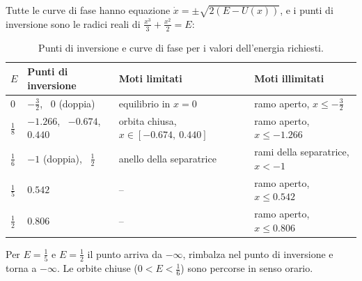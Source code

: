 \documentclass[11pt, a4paper, openright]{book}
\theoremstyle{plain}
\theoremstyle{definition}
\theoremstyle{remark}
\begin{document}
Tutte le curve di fase hanno equazione $\dot{x} = \pm\sqrt{2(E - U(x))}$, e i punti di inversione sono le radici reali di $\frac{x^3}{3} + \frac{x^2}{2} = E$:
\begin{table}[H]
    \centering
    \renewcommand{\arraystretch}{2}
    \begin{tabular}{>{\centering\arraybackslash}m{1cm} >{\centering\arraybackslash}m{4.4cm} >{\centering\arraybackslash}m{4cm} >{\centering\arraybackslash}m{4cm}}
        \toprule
        $E$ & Punti di inversione & Moti limitati & Moti illimitati \\
        \midrule
        $0$ & $-\tfrac{3}{2}$, \ $0$ (doppia) & equilibrio in $x = 0$ & ramo aperto, $x \leq -\tfrac{3}{2}$ \\
        $\tfrac{1}{8}$ & $-1.266$, \ $-0.674$, \ $0.440$ & orbita chiusa, $x \in [-0.674,\ 0.440]$ & ramo aperto, $x \leq -1.266$ \\
        $\tfrac{1}{6}$ & $-1$ (doppia), \ $\tfrac{1}{2}$ & anello della separatrice & rami della separatrice, $x < -1$ \\
        $\tfrac{1}{5}$ & $0.542$ & -- & ramo aperto, $x \leq 0.542$ \\
        $\tfrac{1}{2}$ & $0.806$ & -- & ramo aperto, $x \leq 0.806$ \\
        \bottomrule
    \end{tabular}
    \caption{Punti di inversione e curve di fase per i valori dell'energia richiesti.}
\end{table}
Per $E = \frac{1}{5}$ e $E = \frac{1}{2}$ il punto arriva da $-\infty$, rimbalza nel punto di inversione e torna a $-\infty$. Le orbite chiuse ($0 < E < \frac{1}{6}$) sono percorse in senso orario.
\end{document}
